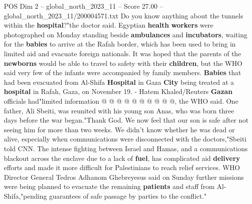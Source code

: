 \begin{textsample}{POS Dim 2 – global\_north\_2023\_11 – Score 27.00 – global\_north\_2023\_11/200004571.txt}
Do you know anything about the tunnels within the \textbf{hospital}?"the doctor said.
Egyptian \textbf{health} \textbf{workers} were photographed on Monday standing beside \textbf{ambulances} and \textbf{incubators}, waiting for the \textbf{babies} to arrive at the Rafah border, which has been used to bring in limited aid and evacuate foreign nationals.
It was hoped that the parents of the \textbf{newborns} would be able to travel to safety with their \textbf{children}, but the WHO said very few of the infants were accompanied by family members. \textbf{Babies} that had been evacuated from Al-Shifa \textbf{Hospital} in Gaza \textbf{City} being treated at a \textbf{hospital} in Rafah, Gaza, on November 19. - Hatem Khaled/Reuters \textbf{Gazan} officials had"limited information @ @ @ @ @ @ @ @ @ @, the WHO said.
One father, Ali Sbeiti, was reunited with his young son Anas, who was born three days before the war began."Thank God.
We now feel that our son is safe after not seeing him for more than two weeks.
We didn't know whether he was dead or alive, especially when communications were disconnected with the doctors,"Sbeiti told CNN.
The intense fighting between Israel and Hamas, and a communications blackout across the enclave due to a lack of \textbf{fuel}, has complicated aid \textbf{delivery} efforts and made it more difficult for Palestinians to reach relief services.
WHO Director General Tedros Adhanom Ghebreyesus said on Sunday further missions were being planned to evacuate the remaining \textbf{patients} and staff from Al-Shifa,"pending guarantees of safe passage by parties to the conflict."

\end{textsample}
